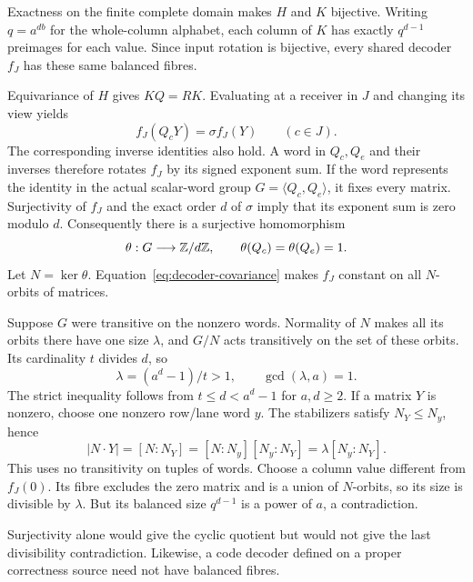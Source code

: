 \begin{outline}
Exactness on the finite complete domain makes $H$ and $K$ bijective.
Writing $q=a^{db}$ for the whole-column alphabet, each column of $K$
has exactly $q^{d-1}$ preimages for each value.  Since input rotation is
bijective, every shared decoder $f_J$ has these same balanced fibres.

Equivariance of $H$ gives $KQ=RK$.  Evaluating at a receiver in $J$ and
changing its view yields
\begin{equation}\label{eq:decoder-covariance}
 f_J(Q_cY)=\sigma f_J(Y)\qquad(c\in J).
\end{equation}
The corresponding inverse identities also hold.  A word in $Q_c,Q_e$
and their inverses therefore rotates $f_J$ by its signed exponent sum.
If the word represents the identity in the actual scalar-word group
$G=\langle Q_c,Q_e\rangle$, it fixes every matrix.  Surjectivity of
$f_J$ and the exact order $d$ of $\sigma$ imply that its exponent sum
is zero modulo $d$.  Consequently there is a surjective homomorphism
\[
 \theta:G\longrightarrow\mathbb{Z}/d\mathbb{Z},
 \qquad\theta(Q_c)=\theta(Q_e)=1.
\]
Let $N=\ker\theta$.  Equation~\eqref{eq:decoder-covariance} makes $f_J$
constant on all $N$-orbits of matrices.

Suppose $G$ were transitive on the nonzero words.  Normality of $N$
makes all its orbits there have one size $\lambda$, and $G/N$ acts
transitively on the set of these orbits.  Its cardinality $t$ divides
$d$, so
\[
 \lambda=(a^d-1)/t>1,\qquad \gcd(\lambda,a)=1.
\]
The strict inequality follows from $t\le d<a^d-1$ for $a,d\ge2$.
If a matrix $Y$ is nonzero, choose one nonzero row/lane word $y$.
The stabilizers satisfy $N_Y\le N_y$, hence
\[
 |N\cdot Y|=[N:N_Y]=[N:N_y][N_y:N_Y]
            =\lambda[N_y:N_Y].
\]
This uses no transitivity on tuples of words.  Choose a column value
different from $f_J(0)$.  Its fibre excludes the zero matrix and is a
union of $N$-orbits, so its size is divisible by $\lambda$.  But its
balanced size $q^{d-1}$ is a power of $a$, a contradiction.
\end{outline}

Surjectivity alone would give the cyclic quotient but would not give
the last divisibility contradiction.  Likewise, a code decoder defined
on a proper correctness source need not have balanced fibres.

